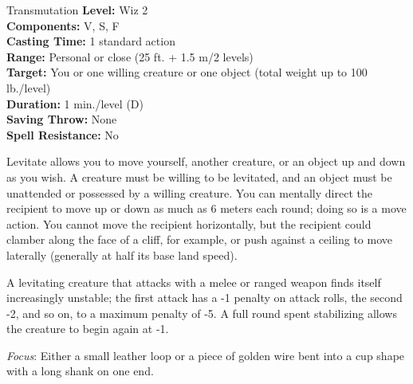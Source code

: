 {Transmutation}
{
	\textbf{Level:}
	Wiz 2\\
	\textbf{Components:}
	V, S, F\\
	\textbf{Casting Time:}
	1 standard action\\
	\textbf{Range:}
	Personal or close (25 ft. + 1.5 m/2 levels)\\
	\textbf{Target:}
	You or one willing creature or one object (total weight up to 100 lb./level)\\
	\textbf{Duration:}
	1 min./level (D)\\
	\textbf{Saving Throw:}
	None\\
	\textbf{Spell Resistance:}
	No\\
}
{
	Levitate allows you to move yourself, another creature, or an object up and down as you wish. A creature must be willing to be levitated, and an object must be unattended or possessed by a willing creature. You can mentally direct the recipient to move up or down as much as 6 meters each round; doing so is a move action. You cannot move the recipient horizontally, but the recipient could clamber along the face of a cliff, for example, or push against a ceiling to move laterally (generally at half its base land speed).

	A levitating creature that attacks with a melee or ranged weapon finds itself increasingly unstable; the first attack has a -1 penalty on attack rolls, the second -2, and so on, to a maximum penalty of -5. A full round spent stabilizing allows the creature to begin again at -1.

	\textit{Focus}:
	Either a small leather loop or a piece of golden wire bent into a cup shape with a long shank on one end.

}
